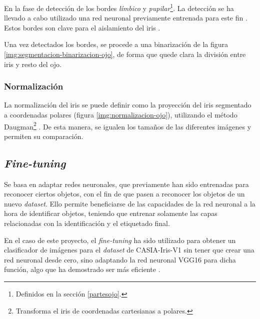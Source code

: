En la fase de detección de los bordes \textit{límbico} y \textit{pupilar}\footnote{Definidos en la sección \ref{partesojo}.}. La detección se ha llevado a cabo utilizado una red neuronal previamente entrenada para este fin \cite{lozej_end--end_2018}. Estos bordes son clave para el aislamiento del iris \cite{tfg_iris_2020}.




Una vez detectados los bordes, se procede a una binarización de la figura \ref{img:segmentacion-binarizacion-ojo}, de forma que quede clara la división entre iris y resto del ojo.



\subsubsection{Normalización}\label{subsubsec:normalizacion}

La normalización del iris se puede definir como la proyección del iris segmentado a coordenadas polares (figura \ref{img:normalizacion-ojo}), utilizando el método Daugman\footnote{Transforma el iris de coordenadas cartesianas a polares.} \cite{daugman_normalization_1993}. De esta manera, se igualen los tamaños de las diferentes imágenes y permiten su comparación.



\subsection{\textit{Fine-tuning}}\label{subsec:fine-tuning}
 Se basa en adaptar redes neuronales, que previamente han sido entrenadas para reconocer ciertos objetos, con el fin de que pasen a reconocer los objetos de un nuevo \textit{dataset}. 
 Ello permite beneficiarse de las capacidades de la red neuronal a la hora de identificar objetos, teniendo que entrenar solamente las capas relacionadas con la identificación y el etiquetado final. 
 
 En el caso de este proyecto, el \textit{fine-tuning} ha sido utilizado para obtener un clasificador de imágenes para el \textit{dataset} de CASIA-Iris-V1 sin tener que crear una red neuronal desde cero, sino adaptando la red
  neuronal VGG16 para dicha función, algo que ha demostrado ser más eficiente \cite{boyd_deep_2020}.

